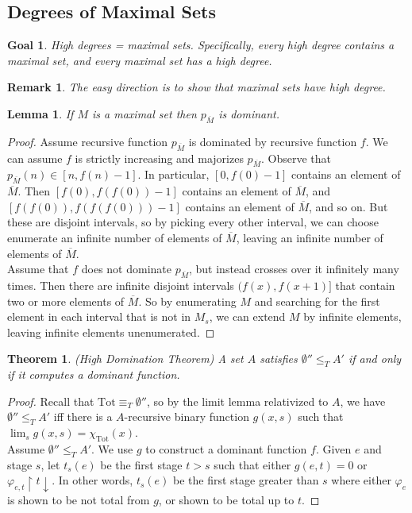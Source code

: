 \documentclass{article}
\newtheorem{lemma}{Lemma}[subsection]
\newtheorem{theorem}{Theorem}[subsection]
\newtheorem{goal}{Goal}[subsection]
\newtheorem{remark}{Remark}[subsection]
\begin{document}
\subsection{Degrees of Maximal Sets}
  \begin{goal}
    High degrees = maximal sets.
    Specifically, every high degree contains a maximal set, and every
    maximal set has a high degree. 
  \end{goal}

  \begin{remark}
    The easy direction is to show that maximal sets have high degree. 
  \end{remark}

  \begin{lemma}
    If $M$ is a maximal set then $p_{\overline{M}}$ is dominant.
    \label{lemma:high-maximal}
  \end{lemma}
  \begin{proof}
    Assume recursive function $p_{\overline{M}}$ is dominated by recursive
    function $f$. We can assume $f$ is strictly increasing and majorizes
    $p_{\overline{M}}$. Observe that
    $p_{\overline{M}}(n)\in[n,f(n)-1]$. In particular, $[0,f(0)-1]$
    contains an element of $\overline{M}$. Then $[f(0),f(f(0))-1]$ contains
    an element of $\overline{M}$, and $[f(f(0)),f(f(f(0)))-1]$ contains an
    element of $\overline{M}$, and so on. But these are disjoint intervals,
    so by picking every other interval, we can choose enumerate an infinite
    number of elements of $\overline{M}$, leaving an infinite number of
    elements of $\overline{M}$. \\

    Assume that $f$ does not dominate $p_{\overline{M}}$, but instead
    crosses over it infinitely many times. Then there are infinite disjoint
    intervals $(f(x),f(x+1)]$ that contain two or more elements of
    $\overline{M}$. So by enumerating $M$ and searching for the first
    element in each interval that is not in $M_s$, we can extend $M$ by
    infinite elements, leaving infinite elements unenumerated.
  \end{proof}

  \begin{theorem}
    \textit{(High Domination Theorem)} A set $A$ satisfies
    $\emptyset''\leq_T A'$ if and only if it computes a dominant function.
    \label{thm:high-domination}
  \end{theorem}
  \begin{proof}
    Recall that $\text{Tot}\equiv_T \emptyset''$, so by the limit lemma
    relativized to $A$, we have $\emptyset''\leq_T A'$ iff there is a
    $A$-recursive binary function $g(x,s)$ such that $\lim_s g(x,s)
    =\chi_{\text{Tot}}(x)$. \\

    Assume $\emptyset''\leq_T A'$. We use $g$ to construct a dominant
    function $f$. Given $e$ and stage $s$, let $t_s(e)$ be the first stage
    $t>s$ such that either $g(e,t)=0$ or $\varphi_{e,t}\restriction
    t\downarrow$. In other words, $t_s(e)$ be the first stage greater than
    $s$ where either $\varphi_e$ is shown to be not total from $g$, or
    shown to be total up to $t$.
  \end{proof}
\end{document}
